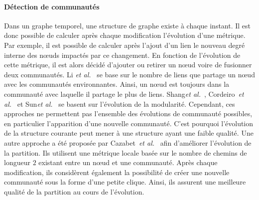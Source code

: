\paragraph{Détection de communautés}
Dans un graphe temporel, une structure de graphe existe à chaque instant.
Il est donc possible de calculer après chaque modification l'évolution d'une métrique.
Par exemple, il est possible de calculer après l'ajout d'un lien le nouveau degré interne des n\oe uds impactés par ce changement.
En fonction de l'évolution de cette métrique, il est alors décidé d'ajouter ou retirer un n\oe ud voire de fusionner deux communautés.
Li \emph{et al.}~\cite{Li2012a} se base sur le nombre de liens que partage un n\oe ud avec les communautés environnantes.
Ainsi, un n\oe ud est toujours dans la communauté avec laquelle il partage le plus de liens.
Shang\emph{et al.}~\cite{Shang2014a}, Cordeiro~\emph{et al.}~\cite{Cordeiro2016} et Sun\emph{et al.}~\cite{Sun2014} se basent sur l'évolution de la modularité.
Cependant, ces approches ne permettent pas l'ensemble des évolutions de communauté possibles, en particulier l'apparition d'une nouvelle communauté.
C'est pourquoi l'évolution de la structure courante peut mener à une structure ayant une faible qualité.
Une autre approche a été proposée par Cazabet~\emph{et al.}~\cite{Cazabet2010} afin d'améliorer l'évolution de la partition.
Ils utilisent une métrique locale basée sur le nombre de chemins de longueur $2$ existant entre un n\oe ud et une communauté.
Après chaque modification, ils considèrent également la possibilité de créer une nouvelle communauté sous la forme d'une petite clique.
Ainsi, ils assurent une meilleure qualité de la partition au cours de l'évolution.


